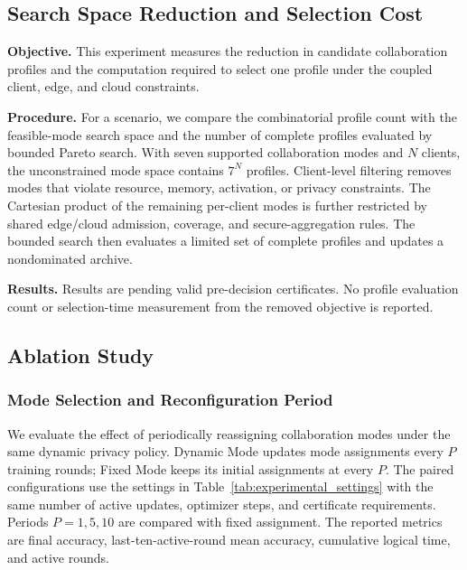 \documentclass[5p,times]{elsarticle}
\theoremstyle{plain}
\theoremstyle{definition}
\theoremstyle{remark}
\begin{document}
\subsection{Search Space Reduction and Selection Cost}
\label{sec:exp_search_cost}

\textbf{Objective.}
This experiment measures the reduction in candidate collaboration
profiles and the computation required to select one profile under
the coupled client, edge, and cloud constraints.

\textbf{Procedure.}
For a scenario, we compare the combinatorial profile count with the
feasible-mode search space and the number of complete profiles
evaluated by bounded Pareto search. With seven supported collaboration
modes and $N$ clients, the unconstrained mode space contains $7^N$
profiles. Client-level filtering removes modes that violate resource,
memory, activation, or privacy constraints. The Cartesian product of
the remaining per-client modes is further restricted by shared
edge/cloud admission, coverage, and secure-aggregation rules. The
bounded search then evaluates a limited set of complete profiles and
updates a nondominated archive.

\textbf{Results.}
Results are pending valid pre-decision certificates. No profile
evaluation count or selection-time measurement from the removed
objective is reported.

\subsection{Ablation Study}
\label{sec:ablation_result}

\subsubsection{Mode Selection and Reconfiguration Period}
\label{subsec:dynamic_mode_ablation}

We evaluate the effect of periodically reassigning collaboration modes
under the same dynamic privacy policy. Dynamic Mode updates mode
assignments every $P$ training rounds; Fixed Mode keeps its initial
assignments at every $P$. The paired configurations use the settings in
Table~\ref{tab:experimental_settings} with the same number of active
updates, optimizer steps, and certificate requirements. Periods $P=1,5,10$
are compared with fixed assignment. The reported metrics are final
accuracy, last-ten-active-round mean accuracy, cumulative logical time,
and active rounds.
\end{document}
